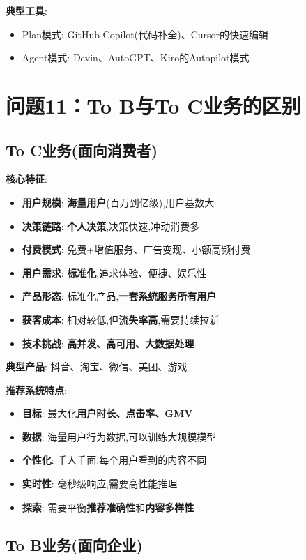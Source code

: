 \documentclass[UTF8]{ctexart}
\begin{document}
\textbf{典型工具}:
\begin{itemize}
    \item Plan模式: GitHub Copilot(代码补全)、Cursor的快速编辑
    \item Agent模式: Devin、AutoGPT、Kiro的Autopilot模式
\end{itemize}

\section{问题11：To B与To C业务的区别}

\subsection{To C业务(面向消费者)}

\textbf{核心特征}:
\begin{itemize}
    \item \textbf{用户规模}: \textbf{海量用户}(百万到亿级),用户基数大
    \item \textbf{决策链路}: \textbf{个人决策},决策快速,冲动消费多
    \item \textbf{付费模式}: 免费+增值服务、广告变现、小额高频付费
    \item \textbf{用户需求}: \textbf{标准化},追求体验、便捷、娱乐性
    \item \textbf{产品形态}: 标准化产品,\textbf{一套系统服务所有用户}
    \item \textbf{获客成本}: 相对较低,但\textbf{流失率高},需要持续拉新
    \item \textbf{技术挑战}: \textbf{高并发、高可用、大数据处理}
\end{itemize}

\textbf{典型产品}: 抖音、淘宝、微信、美团、游戏

\textbf{推荐系统特点}:
\begin{itemize}
    \item \textbf{目标}: 最大化\textbf{用户时长、点击率、GMV}
    \item \textbf{数据}: 海量用户行为数据,可以训练大规模模型
    \item \textbf{个性化}: 千人千面,每个用户看到的内容不同
    \item \textbf{实时性}: 毫秒级响应,需要高性能推理
    \item \textbf{探索}: 需要平衡\textbf{推荐准确性}和\textbf{内容多样性}
\end{itemize}

\subsection{To B业务(面向企业)}
\end{document}
